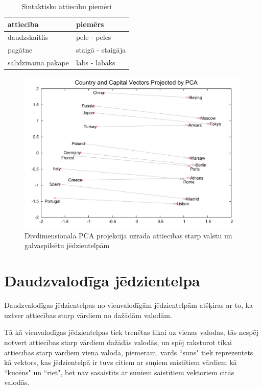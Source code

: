 \begin{table}[htbp]
	\centering
	\caption{Sintaktisko attiecību piemēri \cite{word2vec2013}}
	\begin{tabular}{ll}\toprule
		attiecība & piemērs  \\\midrule
		daudzskaitlis   & pele - peles \\
		pagātne   & staigā - staigāja \\
		salīdzināmā pakāpe   & labs - labāks \\\bottomrule
	\end{tabular}%
	\label{tab:sintactic-relationship-examples}%
\end{table}


\begin{figure}[h]
	\centering
	\includegraphics[width=\textwidth]{figures/word2vec-country-capital.png}
	\caption{Divdimensionāla PCA projekcija uzrāda attiecības starp valstu un galvaspilsētu jēdzientelpām \cite{colyer2016}}
	\label{fig:country-capital}%
\end{figure}



\section{Daudzvalodīga jēdzientelpa}

Daudzvalodīgas jēdzientelpas no vienvalodīgām jēdzientelpām atšķiras ar to, ka uztver attiecības starp vārdiem no dažādām valodām.

Tā kā vienvalodīgas jēdzientelpas tiek trenētas tikai uz vienas valodas, tās nespēj notvert attiecības starp vārdiem dažādās valodās, un spēj raksturot tikai attiecības starp vārdiem vienā valodā, piemēram, vārds “suns" tiek reprezentēts kā vektors, kas jēdzientelpā ir tuvs citiem ar suņiem saistītiem vārdiem kā “kucēns" un “riet", bet nav sasaistīts ar suņiem saistītiem vektoriem citās valodās.

